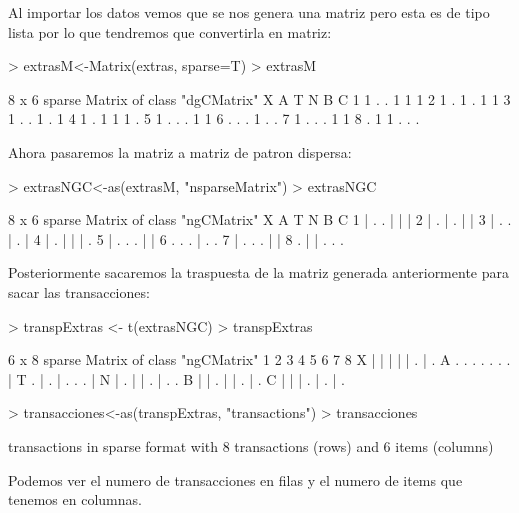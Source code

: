 \documentclass [a4paper] {article}
\begin{document}
Al importar los datos vemos que se nos genera una matriz pero esta es de tipo lista por lo que tendremos que convertirla en matriz:
\begin{Schunk}
\begin{Sinput}
> extrasM<-Matrix(extras, sparse=T)
> extrasM
\end{Sinput}
\begin{Soutput}
8 x 6 sparse Matrix of class "dgCMatrix"
  X A T N B C
1 1 . . 1 1 1
2 1 . 1 . 1 1
3 1 . . 1 . 1
4 1 . 1 1 1 .
5 1 . . . 1 1
6 . . . 1 . .
7 1 . . . 1 1
8 . 1 1 . . .
\end{Soutput}
\end{Schunk}

Ahora pasaremos la matriz a matriz de patron dispersa:
\begin{Schunk}
\begin{Sinput}
> extrasNGC<-as(extrasM, "nsparseMatrix")
> extrasNGC
\end{Sinput}
\begin{Soutput}
8 x 6 sparse Matrix of class "ngCMatrix"
  X A T N B C
1 | . . | | |
2 | . | . | |
3 | . . | . |
4 | . | | | .
5 | . . . | |
6 . . . | . .
7 | . . . | |
8 . | | . . .
\end{Soutput}
\end{Schunk}

Posteriormente sacaremos la traspuesta de la matriz generada anteriormente para sacar las transacciones:
\begin{Schunk}
\begin{Sinput}
> transpExtras <- t(extrasNGC)
> transpExtras
\end{Sinput}
\begin{Soutput}
6 x 8 sparse Matrix of class "ngCMatrix"
  1 2 3 4 5 6 7 8
X | | | | | . | .
A . . . . . . . |
T . | . | . . . |
N | . | | . | . .
B | | . | | . | .
C | | | . | . | .
\end{Soutput}
\begin{Sinput}
> transacciones<-as(transpExtras, "transactions")
> transacciones
\end{Sinput}
\begin{Soutput}
transactions in sparse format with
 8 transactions (rows) and
 6 items (columns)
\end{Soutput}
\end{Schunk}

Podemos ver el numero de transacciones en filas y el numero de items que tenemos en columnas.
\end{document}
